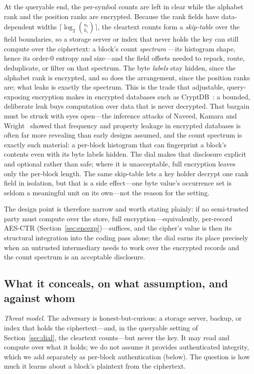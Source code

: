 \documentclass[entropy,article,submit,oneauthor,pdftex]{Definitions/mdpi}
\begin{document}
At the queryable end, the per-symbol counts are left in clear while the alphabet rank
and the position ranks are encrypted. Because the rank fields have data-dependent
widths $\lceil\log_2\binom{n_i}{k_i}\rceil$, the cleartext counts form a
\emph{skip-table} over the field boundaries, so a storage server or index that never
holds the key can still compute over the ciphertext: a block's count \emph{spectrum}
---its histogram shape, hence its order-$0$ entropy and size---and the field offsets
needed to repack, route, deduplicate, or filter on that spectrum. The byte
\emph{labels} stay hidden, since the alphabet rank is encrypted, and so does the
arrangement, since the position ranks are; what leaks is exactly the spectrum. This
is the trade that adjustable, query-exposing encryption makes in encrypted databases
such as CryptDB~\cite{popa2011cryptdb}: a bounded, deliberate leak buys computation
over data that is never decrypted. That bargain must be struck with eyes open---the
inference attacks of Naveed, Kamara and Wright~\cite{naveed2015inference} showed that
frequency and property leakage in encrypted databases is often far more revealing than
early designs assumed, and the count spectrum is exactly such material: a per-block
histogram that can fingerprint a block's contents even with its byte labels hidden. The
dial makes that disclosure explicit and optional rather than safe; where it is
unacceptable, full encryption leaves only the per-block length. The same skip-table lets a key holder decrypt one
rank field in isolation, but that is a side effect---one byte value's occurrence set
is seldom a meaningful unit on its own---not the reason for the setting.

The design point is therefore narrow and worth stating plainly: if no semi-trusted
party must compute over the store, full encryption---equivalently, per-record
AES-CTR (Section~\ref{sec:encexp})---suffices, and the cipher's value is then its
structural integration into the coding pass alone; the dial earns its place precisely when
an untrusted intermediary needs to work over the encrypted records and the count spectrum
is an acceptable disclosure.

\subsection{What it conceals, on what assumption, and against whom}
\emph{Threat model.} The adversary is honest-but-curious: a storage server, backup, or
index that holds the ciphertext---and, in the queryable setting of
Section~\ref{sec:dial}, the cleartext counts---but never the key. It may read and compute
over what it holds; we do not assume it provides authenticated integrity, which we add
separately as per-block authentication (below). The question is how much it learns about a
block's plaintext from the ciphertext.
\end{document}
